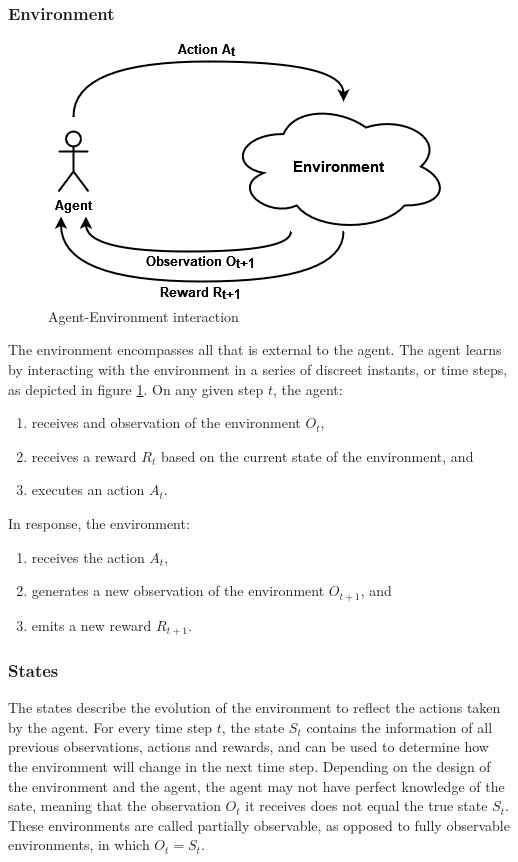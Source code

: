 \subsubsection{Environment}

\begin{figure}[!h]
    \centering
    \includegraphics[width=.5\textwidth]{figs/RL_schema.png}
    \caption{Agent-Environment interaction}
    \label{fig:interaction}
\end{figure}

The environment encompasses all that is external to the agent. The agent learns by interacting with the environment in a series of discreet instants, or time steps, as depicted in figure \ref{fig:interaction}. On any given step $t$, the agent:

\begin{enumerate}
    \item receives and observation of the environment $O_t$,
    \item receives a reward $R_t$ based on the current state of the environment, and
    \item executes an action $A_t$.
\end{enumerate}

In response, the environment:

\begin{enumerate}
    \item receives the action $A_t$,
    \item generates a new observation of the environment $O_{t+1}$, and
    \item emits a new reward $R_{t+1}$.
\end{enumerate}

\subsubsection{States}

The states describe the evolution of the environment to reflect the actions taken by the agent. For every time step $t$, the state $S_t$ contains the information of all previous observations, actions and rewards, and can be used to determine how the environment will change in the next time step. Depending on the design of the environment and the agent, the agent may not have perfect knowledge of the sate, meaning that the observation $O_t$ it receives does not equal the true state $S_t$. These environments are called partially observable, as opposed to fully observable environments, in which $O_t = S_t$.

